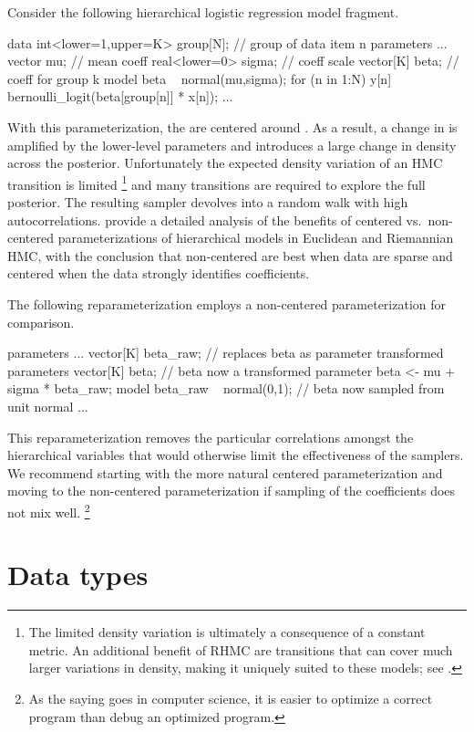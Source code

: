\documentclass[article]{jss}
\begin{document}
Consider the following hierarchical logistic regression model fragment.
%
\begin{Code}
data {
  int<lower=1,upper=K> group[N];  // group of data item n
}  
parameters {
  ...
  vector mu;             // mean coeff
  real<lower=0> sigma;   // coeff scale
  vector[K] beta;        // coeff for group k
}
model {
  beta ~ normal(mu,sigma);
  for (n in 1:N)
    y[n] ~ bernoulli_logit(beta[group[n]] * x[n]);
  ...
}
\end{Code}
%
With this parameterization, the  are centered around
.  As a result, a change in  is amplified by the
lower-level parameters and introduces a large change in density across
the posterior.  Unfortunately the expected density variation of an HMC
transition is limited%
%
\footnote{The limited density variation is ultimately a consequence of
  a constant metric.  An additional benefit of RHMC are transitions
  that can cover much larger variations in density, making it uniquely
  suited to these models; see \citep{Neal:2011}.}
%
and many transitions are required to explore the full posterior.  The
resulting sampler devolves into a random walk with high
autocorrelations.  \cite{BetancourtGirolami:2013} provide a detailed
analysis of the benefits of centered vs.\ non-centered
parameterizations of hierarchical models in Euclidean and Riemannian
HMC, with the conclusion that non-centered are best when data are
sparse and centered when the data strongly identifies coefficients.

The following reparameterization employs a non-centered
parameterization for comparison.
%
\begin{Code}
parameters {
  ...
  vector[K] beta_raw;  // replaces beta as parameter  
}
transformed parameters {
  vector[K] beta;      // beta now a transformed parameter
  beta <- mu + sigma * beta_raw;
}
model {
  beta_raw ~ normal(0,1);  // beta now sampled from unit normal
  ...
}
\end{Code}
%
This reparameterization removes the particular correlations amongst the
hierarchical variables that would otherwise limit the effectiveness
of the samplers.  We recommend starting with the more natural centered
parameterization and moving to the non-centered parameterization if
sampling of the coefficients does not mix well.%
%
\footnote{As the saying goes in computer science, it is easier to
  optimize a correct program than debug an optimized program.}

\section{Data types}
\end{document}
